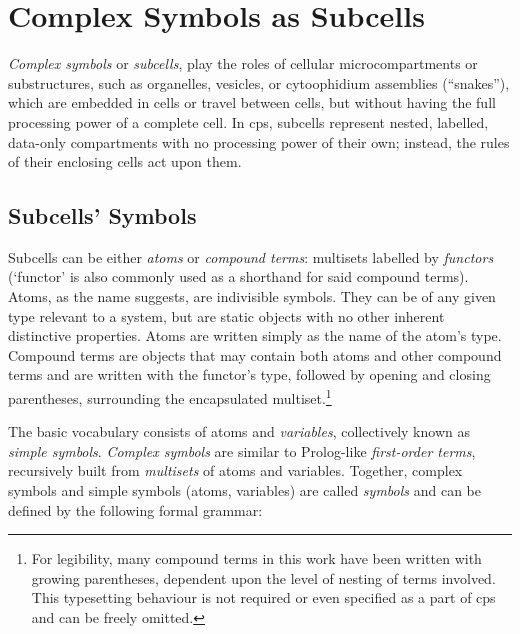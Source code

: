 \section{\label{sec:cps:complexsymbols}Complex Symbols as Subcells}

\emph{Complex symbols} or \emph{subcells}, 
play the roles of cellular microcompartments or substructures,
such as organelles, vesicles, or cytoophidium assemblies (``snakes''),
which are embedded in cells or travel between cells, 
but without having the full processing power of a complete cell.
In \gls{cps}, subcells represent nested, labelled, data-only \glspl{compartment}
with no processing power of their own;
instead, the rules of their enclosing cells act upon them.

\subsection{\label{sec:cps:terms}Subcells' Symbols} 

Subcells can be either \emph{atoms} or \emph{compound terms}: multisets labelled by \emph{\glspl{functor}} (`\gls{functor}' is also commonly used as a shorthand for said compound terms).  Atoms, as the name suggests, are indivisible symbols.  They can be of any given type relevant to a system, but are static objects with no other inherent distinctive properties.  Atoms are written simply as the name of the atom's type.  Compound terms are objects that may contain both atoms and other compound terms and are written with the \gls{functor}'s type, followed by opening and closing parentheses, surrounding the encapsulated multiset.\footnote{For legibility, many compound terms in this work have been written with growing parentheses, dependent upon the level of nesting of terms involved.  This typesetting behaviour is not required or even specified as a part of \gls{cps} and can be freely omitted.}

The basic vocabulary consists of atoms and \emph{variables}, collectively known as \emph{simple symbols}.  \emph{Complex symbols} are similar to Prolog-like \emph{first-order terms}, recursively built from \emph{multisets} of atoms and variables.  Together, complex symbols and simple symbols (atoms, variables) are called \emph{symbols} and can be defined by the following formal grammar:

